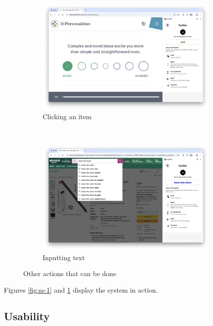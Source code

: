 \begin{figure}[ht]
    \centering
    \begin{subfigure}[ht]{0.48\textwidth}
        \centering
        \includegraphics[width=\textwidth]{images/screenshots/eyenav-click.png}
        \caption{Clicking an item}
    \end{subfigure}
    ~ 
    \begin{subfigure}[ht]{0.48\textwidth}
        \centering
        \includegraphics[width=\textwidth]{images/screenshots/eyenav-input.png}
        \caption{Inputting text}
    \end{subfigure}
    \caption{Other actions that can be done}
    \label{figs:ss-2-3}
\end{figure}

Figures \ref{fig:ss-1} and \ref{figs:ss-2-3} display the system in action. %

\subsection{Usability}


